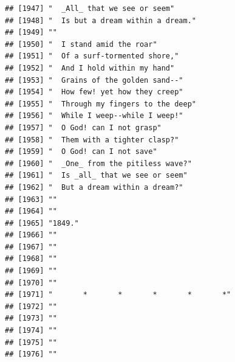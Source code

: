 \documentclass{article}\usepackage[]{graphicx}\usepackage[]{color}
\makeatletter
\newenvironment{kframe}{%
 \def\at@end@of@kframe{}%
 \ifinner\ifhmode%
  \def\at@end@of@kframe{\end{minipage}}%
  \begin{minipage}{\columnwidth}%
 \fi\fi%
 \def\FrameCommand##1{\hskip\@totalleftmargin \hskip-\fboxsep
 \colorbox{shadecolor}{##1}\hskip-\fboxsep
     \hskip-\linewidth \hskip-\@totalleftmargin \hskip\columnwidth}%
 \MakeFramed {\advance\hsize-\width
   \@totalleftmargin\z@ \linewidth\hsize
   \@setminipage}}%
 {\par\unskip\endMakeFramed%
 \at@end@of@kframe}
\newenvironment{knitrout}{}{} %
\makeatother
\begin{document}
\begin{knitrout}
\begin{kframe}
\begin{verbatim}
## [1947] "  _All_ that we see or seem"                                                 
## [1948] "  Is but a dream within a dream."                                            
## [1949] ""                                                                            
## [1950] "  I stand amid the roar"                                                     
## [1951] "  Of a surf-tormented shore,"                                                
## [1952] "  And I hold within my hand"                                                 
## [1953] "  Grains of the golden sand--"                                               
## [1954] "  How few! yet how they creep"                                               
## [1955] "  Through my fingers to the deep"                                            
## [1956] "  While I weep--while I weep!"                                               
## [1957] "  O God! can I not grasp"                                                    
## [1958] "  Them with a tighter clasp?"                                                
## [1959] "  O God! can I not save"                                                     
## [1960] "  _One_ from the pitiless wave?"                                             
## [1961] "  Is _all_ that we see or seem"                                              
## [1962] "  But a dream within a dream?"                                               
## [1963] ""                                                                            
## [1964] ""                                                                            
## [1965] "1849."                                                                       
## [1966] ""                                                                            
## [1967] ""                                                                            
## [1968] ""                                                                            
## [1969] ""                                                                            
## [1970] ""                                                                            
## [1971] "       *       *       *       *       *"                                    
## [1972] ""                                                                            
## [1973] ""                                                                            
## [1974] ""                                                                            
## [1975] ""                                                                            
## [1976] ""                                                                            

\end{verbatim}
\end{kframe}
\end{knitrout}
\end{document}

